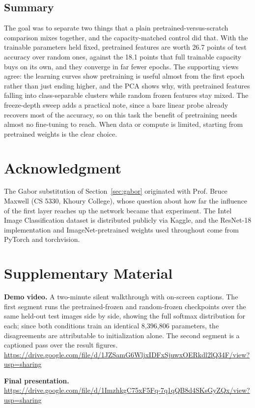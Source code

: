 \documentclass[conference]{IEEEtran}
\begin{document}
\subsection{Summary}
The goal was to separate two things that a plain pretrained-versus-scratch comparison mixes together, and the capacity-matched control did that. With the trainable parameters held fixed, pretrained features are worth 26.7 points of test accuracy over random ones, against the 18.1 points that full trainable capacity buys on its own, and they converge in far fewer epochs. The supporting views agree: the learning curves show pretraining is useful almost from the first epoch rather than just ending higher, and the PCA shows why, with pretrained features falling into class-separable clusters while random frozen features stay mixed. The freeze-depth sweep adds a practical note, since a bare linear probe already recovers most of the accuracy, so on this task the benefit of pretraining needs almost no fine-tuning to reach. When data or compute is limited, starting from pretrained weights is the clear choice.

\section*{Acknowledgment}
The Gabor substitution of Section~\ref{sec:gabor} originated with Prof. Bruce Maxwell (CS 5330, Khoury College), whose question about how far the influence of the first layer reaches up the network became that experiment. The Intel Image Classification dataset is distributed publicly via Kaggle, and the ResNet-18 implementation and ImageNet-pretrained weights used throughout come from PyTorch and torchvision.

\section*{Supplementary Material}
\begin{sloppypar}
\noindent\textbf{Demo video.} A two-minute silent walkthrough with on-screen captions. The first segment runs the pretrained-frozen and random-frozen checkpoints over the same held-out test images side by side, showing the full softmax distribution for each; since both conditions train an identical 8{,}396{,}806 parameters, the disagreements are attributable to initialization alone. The second segment is a captioned pass over the result figures.\\
\url{https://drive.google.com/file/d/1JZSamG6WljxIDFxSjuwxOERkdl2lQ34F/view?usp=sharing}

\vspace{0.6em}
\noindent\textbf{Final presentation.}\\
\url{https://drive.google.com/file/d/1ImzhkgC75xF5Fq-7q1qQB8d4SKsGyZQx/view?usp=sharing}
\end{sloppypar}



\end{document}
